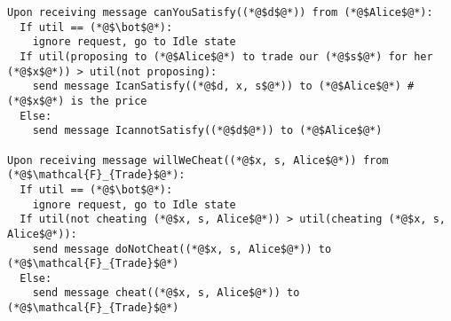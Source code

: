 \begin{lstlisting}[label=satprot, style=numbers]
Upon receiving message canYouSatisfy((*@$d$@*)) from (*@$Alice$@*):
  If util == (*@$\bot$@*):
    ignore request, go to Idle state
  If util(proposing to (*@$Alice$@*) to trade our (*@$s$@*) for her (*@$x$@*)) > util(not proposing):
    send message IcanSatisfy((*@$d, x, s$@*)) to (*@$Alice$@*) # (*@$x$@*) is the price
  Else:
    send message IcannotSatisfy((*@$d$@*)) to (*@$Alice$@*)

Upon receiving message willWeCheat((*@$x, s, Alice$@*)) from (*@$\mathcal{F}_{Trade}$@*):
  If util == (*@$\bot$@*):
    ignore request, go to Idle state
  If util(not cheating (*@$x, s, Alice$@*)) > util(cheating (*@$x, s, Alice$@*)):
    send message doNotCheat((*@$x, s, Alice$@*)) to (*@$\mathcal{F}_{Trade}$@*)
  Else:
    send message cheat((*@$x, s, Alice$@*)) to (*@$\mathcal{F}_{Trade}$@*)
\end{lstlisting}
